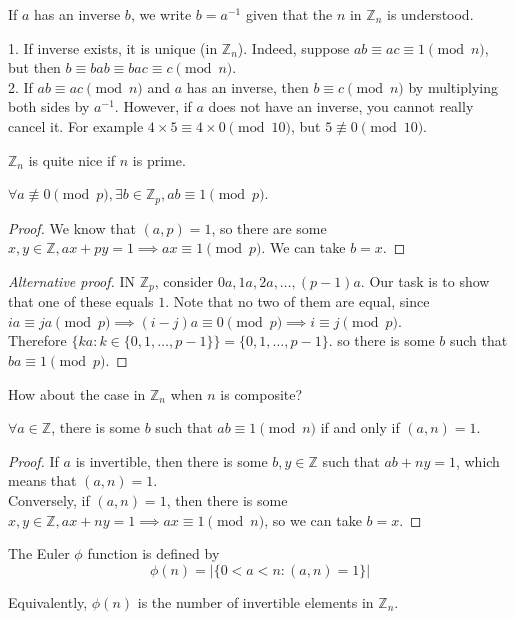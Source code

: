 If $a$ has an inverse $b$, we write $b=a^{-1}$ given that the $n$ in $\mathbb Z_n$ is understood.
\begin{remark}
    1. If inverse exists, it is unique (in $\mathbb Z_n$).
    Indeed, suppose $ab\equiv ac\equiv 1\pmod{n}$, but then $b\equiv bab\equiv bac\equiv c\pmod{n}$.\\
    2. If $ab\equiv ac\pmod{n}$ and $a$ has an inverse, then $b\equiv c\pmod n$ by multiplying both sides by $a^{-1}$.
    However, if $a$ does not have an inverse, you cannot really cancel it.
    For example $4\times 5\equiv 4\times 0\pmod{10}$, but $5\not\equiv 0\pmod{10}$.
\end{remark}
$\mathbb Z_n$ is quite nice if $n$ is prime.
\begin{proposition}
    $\forall a\not\equiv 0\pmod{p},\exists b\in\mathbb Z_p,ab\equiv 1\pmod{p}$.
\end{proposition}
\begin{proof}
    We know that $(a,p)=1$, so there are some $x,y\in\mathbb Z,ax+py=1\implies ax\equiv 1\pmod{p}$.
    We can take $b=x$.
\end{proof}
\begin{proof}[Alternative proof]
    IN $\mathbb Z_p$, consider $0a,1a,2a,\ldots,(p-1)a$.
    Our task is to show that one of these equals $1$.
    Note that no two of them are equal, since $ia\equiv ja\pmod{p}\implies (i-j)a\equiv 0\pmod{p}\implies i\equiv j\pmod{p}$.\\
    Therefore $\{ka:k\in\{0,1,\ldots,p-1\}\}=\{0,1,\ldots,p-1\}$.
    so there is some $b$ such that $ba\equiv 1\pmod{p}$.
\end{proof}
How about the case in $\mathbb Z_n$ when $n$ is composite?
\begin{proposition}
    $\forall a\in\mathbb Z$, there is some $b$ such that $ab\equiv 1\pmod{n}$ if and only if $(a,n)=1$.
\end{proposition}
\begin{proof}
    If $a$ is invertible, then there is some $b,y\in\mathbb Z$ such that $ab+ny=1$, which means that $(a,n)=1$.\\
    Conversely, if $(a,n)=1$, then there is some $x,y\in\mathbb Z, ax+ny=1\implies ax\equiv 1\pmod{n}$, so we can take $b=x$.
\end{proof}
\begin{definition}
    The Euler $\phi$ function is defined by
    $$\phi(n)=|\{0<a<n:(a,n)=1\}|$$
\end{definition}
Equivalently, $\phi(n)$ is the number of invertible elements in $\mathbb Z_n$.
